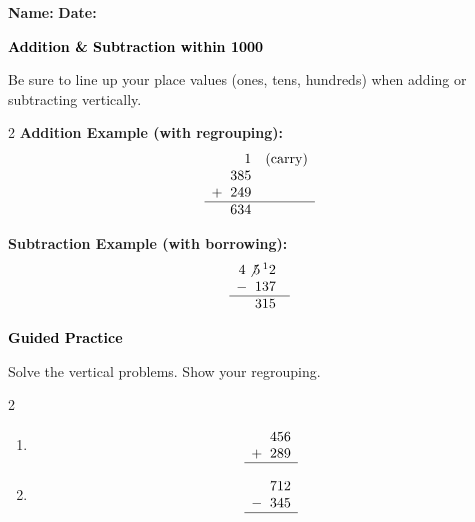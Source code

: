 \documentclass[12pt, letterpaper, fleqn]{article}
\begin{document}
\textbf{Name:} \underline{\hspace{5cm}}
\hfill
\textbf{Date:} \underline{\hspace{3cm}}\\

\begin{tcolorbox}[colback=customteal!20]
    \large\textcolor{black}{\textbf{Addition \& Subtraction within 1000}}
\end{tcolorbox}

\vspace{3mm}
\noindent
Be sure to line up your place values (ones, tens, hundreds) when adding or subtracting vertically.

\begin{multicols}{2}
\textbf{Addition Example (with regrouping):}
\[
\begin{array}{r@{\quad}c}
1 & (\text{carry}) \\
385 \\
+\;\; 249 \\
\hline
634
\end{array}
\]

\columnbreak
\textbf{Subtraction Example (with borrowing):}
\[
\begin{array}{r@{\quad}c}
4\not{5}\,^1 2 \\
-\;\; 137 \\
\hline
315
\end{array}
\]
\end{multicols}

\newpage
\begin{tcolorbox}[colback=customteal!20]
    \large\textcolor{black}{\textbf{Guided Practice}}
\end{tcolorbox}

\vspace{5mm}
\noindent
Solve the vertical problems. Show your regrouping.

\vspace{8mm}
\begin{multicols}{2}
\begin{enumerate}[itemsep=3.5cm, leftmargin=0.6cm]
\item 
\[
\begin{array}{r}
456 \\
+\;\; 289 \\
\hline
\end{array}
\]

\item 
\[
\begin{array}{r}
712 \\
-\;\; 345 \\
\hline
\end{array}
\]
\end{enumerate}
\end{multicols}
\end{document}
